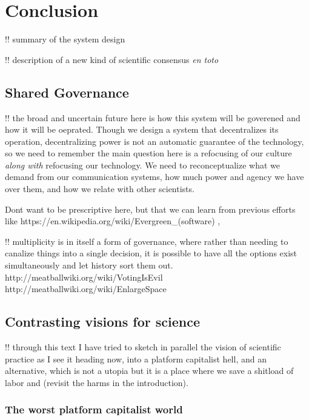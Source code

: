 \documentclass[10pt]{article}
\begin{document}
\hypertarget{conclusion}{%
\section{Conclusion}\label{conclusion}}


\begin{multicols}{2}
 !! summary of the system design

!! description of a new kind of scientific consensus \emph{en toto}

\hypertarget{shared-governance}{%
\subsection{Shared Governance}\label{shared-governance}}

!! the broad and uncertain future here is how this system will be
goverened and how it will be oeprated. Though we design a system that
decentralizes its operation, decentralizing power is not an automatic
guarantee of the technology, so we need to remember the main question
here is a refocusing of our culture \emph{along with} refocusing our
technology. We need to reconceptualize what we demand from our
communication systems, how much power and agency we have over them, and
how we relate with other scientists.

Dont want to be prescriptive here, but that we can learn from previous
efforts like https://en.wikipedia.org/wiki/Evergreen\_(software) ,

!! multiplicity is in itself a form of governance, where rather than
needing to canalize things into a single decision, it is possible to
have all the options exist simultaneously and let history sort them out.
http://meatballwiki.org/wiki/VotingIsEvil
http://meatballwiki.org/wiki/EnlargeSpace

\hypertarget{contrasting-visions-for-science}{%
\subsection{Contrasting visions for
science}\label{contrasting-visions-for-science}}

!! through this text I have tried to sketch in parallel the vision of
scientific practice as I see it heading now, into a platform capitalist
hell, and an alternative, which is not a utopia but it is a place where
we save a shitload of labor and (revisit the harms in the introduction).

\hypertarget{the-worst-platform-capitalist-world}{%
\subsubsection{The worst platform capitalist
world}\label{the-worst-platform-capitalist-world}}


\end{multicols}
\end{document}
